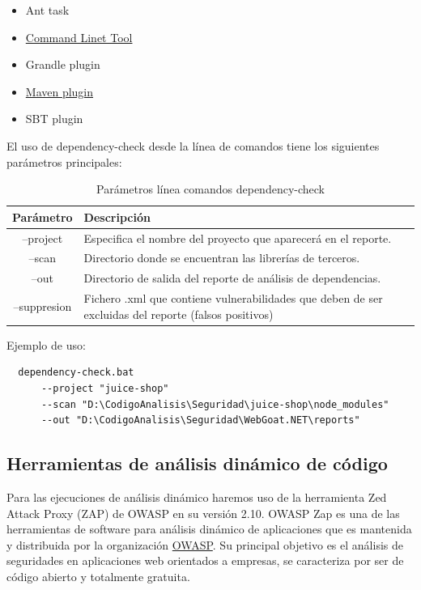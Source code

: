 \begin{itemize}
    \item Ant task
    \item \href{https://github.com/jeremylong/DependencyCheck/releases/download/v6.1.6/dependency-check-6.1.6-release.zip}{Command Linet Tool}
    \item Grandle plugin
    \item \href{https://search.maven.org/#artifactdetails%7Corg.owasp%7Cdependency-check-maven%7C6.1.6%7Cmaven-plugin}{Maven plugin}
    \item SBT plugin
\end{itemize}

El uso de dependency-check desde la línea de comandos tiene los siguientes parámetros principales:\\

\begin{table}[!htb]
  \begin{center}
        \begin{tabular}{c| L{12cm}}
        \hline 
        \textbf{Parámetro} & \textbf{Descripción}\\
        \hline
        --project & Especifica el nombre del proyecto que aparecerá en el reporte.\\ 
        --scan & Directorio donde se encuentran las librerías de terceros.\\
        --out &  Directorio de salida del reporte de análisis de dependencias.\\
        --suppresion & Fichero .xml que contiene vulnerabilidades que deben de ser excluidas del reporte 
        (falsos positivos)      
    \end{tabular}
    \caption{Parámetros línea comandos dependency-check}
    \label{tab:tabla 1}
\end{center}
\end{table}

Ejemplo de uso:\\
\begin{verbatim}
  dependency-check.bat 
      --project "juice-shop" 
      --scan "D:\CodigoAnalisis\Seguridad\juice-shop\node_modules" 
      --out "D:\CodigoAnalisis\Seguridad\WebGoat.NET\reports" 
\end{verbatim}
\clearpage
\newpage

\subsection{Herramientas de análisis dinámico de código}
Para las ejecuciones de análisis dinámico haremos uso de la herramienta Zed Attack Proxy (ZAP) de OWASP en su versión 2.10. OWASP Zap es una de las herramientas de 
software para análisis dinámico de aplicaciones que es mantenida y distribuida por la organización \href{https://owasp.org/www-project-zap/}{OWASP}. Su principal objetivo es el 
análisis de seguridades en aplicaciones web orientados a empresas, se caracteriza por ser de código abierto y totalmente gratuita.\\

